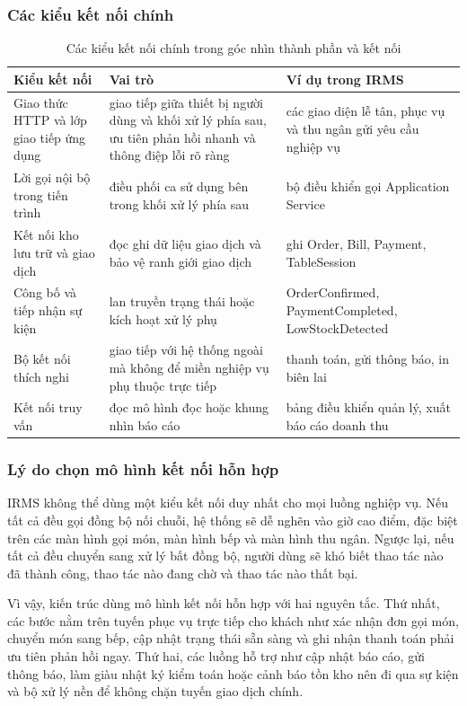 \documentclass[11pt,a4paper]{article}
\begin{document}
\subsubsection{Các kiểu kết nối chính}
\begin{table}[H]
\centering
\caption{Các kiểu kết nối chính trong góc nhìn thành phần và kết nối}
\begin{tabularx}{\textwidth}{|p{3.2cm}|X|p{3.2cm}|}
\hline
\textbf{Kiểu kết nối} & \textbf{Vai trò} & \textbf{Ví dụ trong IRMS} \\
\hline
Giao thức HTTP và lớp giao tiếp ứng dụng & giao tiếp giữa thiết bị người dùng và khối xử lý phía sau, ưu tiên phản hồi nhanh và thông điệp lỗi rõ ràng & các giao diện lễ tân, phục vụ và thu ngân gửi yêu cầu nghiệp vụ \\
\hline
Lời gọi nội bộ trong tiến trình & điều phối ca sử dụng bên trong khối xử lý phía sau & bộ điều khiển gọi \textsf{Application Service} \\
\hline
Kết nối kho lưu trữ và giao dịch & đọc ghi dữ liệu giao dịch và bảo vệ ranh giới giao dịch & ghi \textsf{Order}, \textsf{Bill}, \textsf{Payment}, \textsf{TableSession} \\
\hline
Công bố và tiếp nhận sự kiện & lan truyền trạng thái hoặc kích hoạt xử lý phụ & \textsf{OrderConfirmed}, \textsf{PaymentCompleted}, \textsf{LowStockDetected} \\
\hline
Bộ kết nối thích nghi & giao tiếp với hệ thống ngoài mà không để miền nghiệp vụ phụ thuộc trực tiếp & thanh toán, gửi thông báo, in biên lai \\
\hline
Kết nối truy vấn & đọc mô hình đọc hoặc khung nhìn báo cáo & bảng điều khiển quản lý, xuất báo cáo doanh thu \\
\hline
\end{tabularx}
\end{table}

\subsubsection{Lý do chọn mô hình kết nối hỗn hợp}
IRMS không thể dùng một kiểu kết nối duy nhất cho mọi luồng nghiệp vụ. Nếu tất cả đều gọi đồng bộ nối chuỗi, hệ thống sẽ dễ nghẽn vào giờ cao điểm, đặc biệt trên các màn hình gọi món, màn hình bếp và màn hình thu ngân. Ngược lại, nếu tất cả đều chuyển sang xử lý bất đồng bộ, người dùng sẽ khó biết thao tác nào đã thành công, thao tác nào đang chờ và thao tác nào thất bại.

Vì vậy, kiến trúc dùng mô hình kết nối hỗn hợp với hai nguyên tắc. Thứ nhất, các bước nằm trên tuyến phục vụ trực tiếp cho khách như xác nhận đơn gọi món, chuyển món sang bếp, cập nhật trạng thái sẵn sàng và ghi nhận thanh toán phải ưu tiên phản hồi ngay. Thứ hai, các luồng hỗ trợ như cập nhật báo cáo, gửi thông báo, làm giàu nhật ký kiểm toán hoặc cảnh báo tồn kho nên đi qua sự kiện và bộ xử lý nền để không chặn tuyến giao dịch chính.
\end{document}
